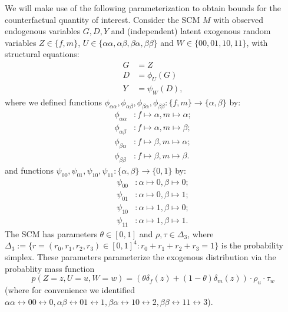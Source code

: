 We will make use of the following parameterization to obtain bounds for the counterfactual quantity of interest.
Consider the SCM $M$ with observed endogenous variables $G, D, Y$ and (independent) latent exogenous random variables $Z \in \{f,m\}$, $U \in \{\alpha\alpha,\alpha\beta,\beta\alpha,\beta\beta\}$ and $W \in \{00,01,10,11\}$,
with structural equations:
\begin{align*}
  G &= Z \\
  D &= \phi_{U}(G) \\
  Y &= \psi_{W}(D),
\end{align*}
where we defined functions $\phi_{\alpha\alpha},\phi_{\alpha\beta},\phi_{\beta\alpha},\phi_{\beta\beta} : \{f,m\} \to \{\alpha,\beta\}$ by:
  \begin{align*}
    \phi_{\alpha\alpha} &: f \mapsto \alpha, m \mapsto \alpha;\\
    \phi_{\alpha\beta}  &: f \mapsto \alpha, m \mapsto \beta;\\
    \phi_{\beta\alpha}  &: f \mapsto \beta, m \mapsto \alpha;\\
    \phi_{\beta\beta}   &: f \mapsto \beta, m \mapsto \beta.
  \end{align*}
and functions $\psi_{00},\psi_{01},\psi_{10},\psi_{11} : \{\alpha,\beta\} \to \{0,1\}$ by:
  \begin{align*}
    \psi_{00} &: \alpha \mapsto 0, \beta \mapsto 0;\\
    \psi_{01} &: \alpha \mapsto 0, \beta \mapsto 1;\\
    \psi_{10} &: \alpha \mapsto 1, \beta \mapsto 0;\\
    \psi_{11} &: \alpha \mapsto 1, \beta \mapsto 1.
  \end{align*}
The SCM has parameters $\theta \in [0,1]$ and $\rho, \tau \in\Delta_3$, where 
$\Delta_3:=\{r=(r_0,r_1,r_2,r_3) \in [0,1]^4 : r_0+r_1+r_2+r_3= 1\}$ is the probability simplex.
These parameters parameterize the exogenous distribution via the probablity mass function
$$p(Z=z,U=u,W=w) = (\theta \delta_f(z) + (1-\theta) \delta_m(z)) \cdot \rho_u \cdot \tau_w$$
(where for convenience we identified $\alpha\alpha \leftrightarrow 00 \leftrightarrow 0, \alpha\beta \leftrightarrow 01 \leftrightarrow 1, \beta\alpha \leftrightarrow 10 \leftrightarrow 2, \beta\beta \leftrightarrow 11 \leftrightarrow 3$).

